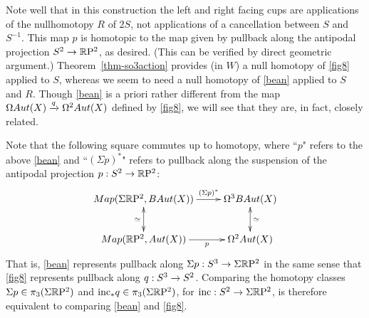 \documentclass{amsart}
\begin{document}
Note well that in this construction the left and right facing cups are applications of the nullhomotopy $R$ of $2S$, not applications of a cancellation between $S$ and $S^{-1}$.  This map $p$ is homotopic to the map given by pullback along the antipodal projection $S^2 \rightarrow \mathbb R \mathrm{P}^2$, as desired.  (This can be verified by direct geometric argument.)  Theorem~\ref{thm-so3action} provides (in $W$) a null homotopy of \cref{fig8} applied to $S$, whereas we seem to need a null homotopy of \cref{bean} applied to $S$ and $R$.  Though \cref{bean} is a priori rather different from the map $\Omega Aut(X) \xrightarrow{q} \Omega^2 Aut(X)$ defined by \cref{fig8}, we will see that they are, in fact, closely related.

Note that the following square commutes up to homotopy, where ``$p$" refers to the above \cref{bean} and ``$(\Sigma p)^\ast$" refers to pullback along the suspension of the antipodal projection $p: S^2 \rightarrow \mathbb R \mathrm{P}^2$:
\[
\xymatrix{
\Map(\Sigma\RP^2,B\Aut(X)) \ar[r]^-{(\Sigma p)^\ast} \ar@{<->}[d]_{\simeq} & \Omega^3 B\Aut(X)  \ar@{<->}[d]^{\simeq} \\
\Map(\RP^2,\Aut(X)) \ar[r]_-{p} & \Omega^2 \Aut(X)
}
\]
That is, \cref{bean} represents pullback along $\Sigma p: S^3 \rightarrow \Sigma \mathbb R \mathrm{P}^2$ in the same sense that \cref{fig8} represents pullback along $q: S^3 \rightarrow S^2$.  Comparing the homotopy classes $\Sigma p \in \pi_3(\Sigma \mathbb R \mathrm{P}^2)$ and $\mathrm{inc}_* q \in \pi_3(\Sigma \mathbb R \mathrm{P}^2)$, for $\mathrm{inc}: S^2 \rightarrow \Sigma \mathbb R \mathrm{P}^2$, is therefore equivalent to comparing \cref{bean} and \cref{fig8}.  
\end{document}
